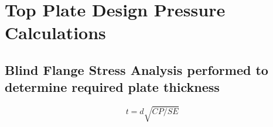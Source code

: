 \section{Top Plate Design Pressure Calculations}
\label{app:top_plate_pressure}

\subsection{Blind Flange Stress Analysis performed to determine required plate thickness}
\label{app:blind_flange_stress}

\begin{equation}
    t= d\sqrt{CP/SE}
\end{equation}

